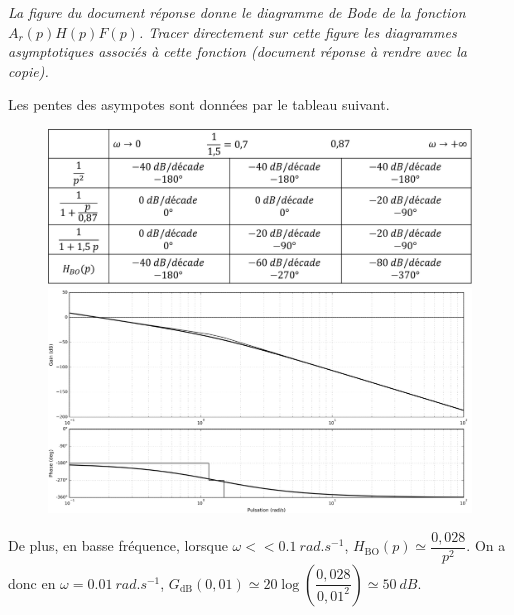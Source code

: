 \question{\label{q_15}}\textit{La figure du document réponse donne le diagramme de Bode de la fonction $A_r(p)H(p)F(p)$. Tracer directement sur cette figure les diagrammes asymptotiques associés à cette fonction (document réponse à rendre avec la copie).}
\ifprof
\begin{corrige}
Les pentes des asympotes sont données par le tableau suivant. 
\begin{figure}[H]
\centering
\includegraphics[width=.8\linewidth]{images/cor_q15}

\includegraphics[width=.8\linewidth]{images/cor_q15_bode}
\end{figure}

De plus, en basse fréquence, lorsque 
$\omega << \SI{0,1}{rad.s^{-1}}$, 
$H_{\text{BO}}(p)\simeq \dfrac{0,028}{p^2}$. 
On a donc  en $\omega = \SI{0,01}{rad.s^{-1}}$, $G_{\text{dB}}(0,01)\simeq 20\log \left(\dfrac{0,028}{0,01^2}\right)\simeq \SI{50}{dB}$.


\end{corrige}
\else
\fi

